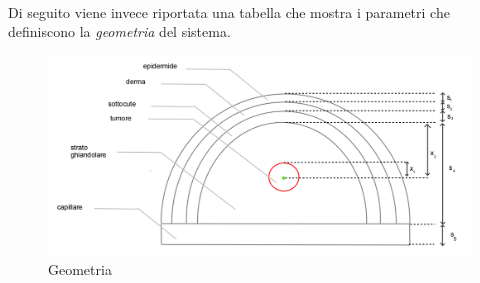 \noindent
\\\\\\Di seguito viene invece riportata una tabella che mostra i parametri che definiscono la \textit{geometria} del sistema.

\begin{adjustwidth}{0cm}{0cm}
	\begin{multicols}{2} %

        \hspace{-1.3cm}
        \begin{minipage}{\columnwidth}
        \begin{figure}[H]
        \centering
        \includegraphics[scale = 0.5]{Immagini/geometria.png}
        \caption{Geometria}
        \label{geometria}
        \end{figure}
		\end{minipage}
  
		\columnbreak %

        \hspace{1.5cm}
        \begin{minipage}{\columnwidth}
        \vspace{1.8cm}
        \begin{table}[H]
        \centering
        \end{table}
		\end{minipage}
  
	\end{multicols}
\end{adjustwidth}


\newpage